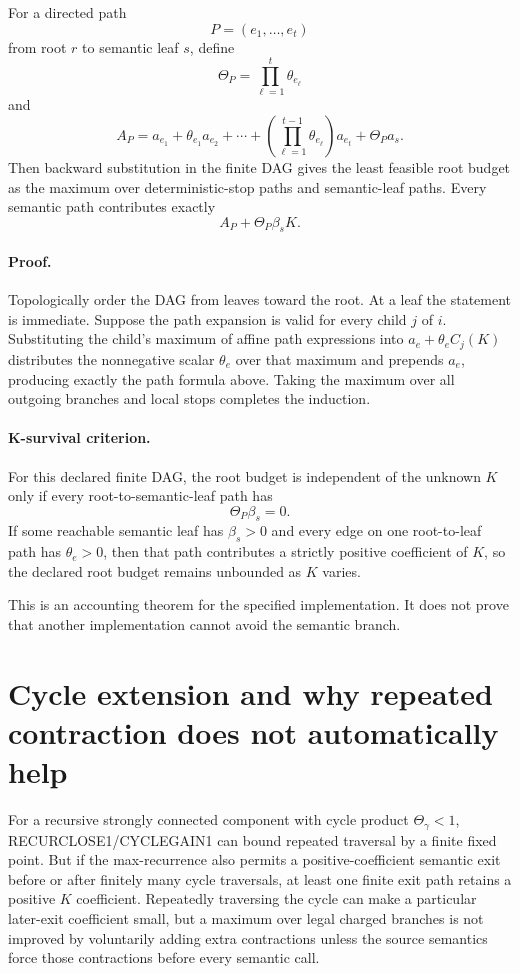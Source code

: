 \documentclass[11pt]{article}
\begin{document}
For a directed path
\[
P=(e_1,\ldots,e_t)
\]
from root \(r\) to semantic leaf \(s\), define
\[
\Theta_P=\prod_{\ell=1}^t\theta_{e_\ell}
\]
and
\[
A_P=a_{e_1}+\theta_{e_1}a_{e_2}+\cdots+
\left(\prod_{\ell=1}^{t-1}\theta_{e_\ell}\right)a_{e_t}
+\Theta_P a_s.
\]
Then backward substitution in the finite DAG gives the least feasible root budget as the maximum over deterministic-stop paths and semantic-leaf paths. Every semantic path contributes exactly
\[
A_P+\Theta_P\beta_s K.
\]

\paragraph{Proof.}
Topologically order the DAG from leaves toward the root. At a leaf the statement is immediate. Suppose the path expansion is valid for every child \(j\) of \(i\). Substituting the child's maximum of affine path expressions into
\(a_e+\theta_e C_j(K)\) distributes the nonnegative scalar \(\theta_e\) over that maximum and prepends \(a_e\), producing exactly the path formula above. Taking the maximum over all outgoing branches and local stops completes the induction.

\paragraph{K-survival criterion.}
For this declared finite DAG, the root budget is independent of the unknown \(K\) only if every root-to-semantic-leaf path has
\[
\Theta_P\beta_s=0.
\]
If some reachable semantic leaf has \(\beta_s>0\) and every edge on one root-to-leaf path has \(\theta_e>0\), then that path contributes a strictly positive coefficient of \(K\), so the declared root budget remains unbounded as \(K\) varies.

This is an accounting theorem for the specified implementation. It does not prove that another implementation cannot avoid the semantic branch.

\section*{Cycle extension and why repeated contraction does not automatically help}
For a recursive strongly connected component with cycle product \(\Theta_\gamma<1\), RECURCLOSE1/CYCLEGAIN1 can bound repeated traversal by a finite fixed point. But if the max-recurrence also permits a positive-coefficient semantic exit before or after finitely many cycle traversals, at least one finite exit path retains a positive \(K\) coefficient. Repeatedly traversing the cycle can make a particular later-exit coefficient small, but a maximum over legal charged branches is not improved by voluntarily adding extra contractions unless the source semantics force those contractions before every semantic call.
\end{document}
